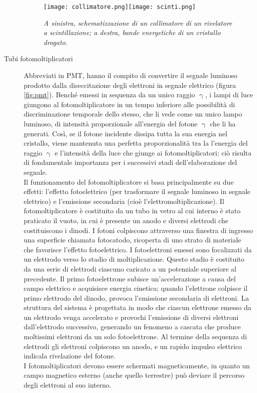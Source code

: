 \documentclass{report}
\newcommand{\figref}[1]{figura \ref{#1}}
\numberwithin{equation}{section}
\numberwithin{figure}{section}
\begin{document}
\begin{description}
\begin{figure}[htp]
    \centering
    \texttt{[image: collimatore.png]}\quad\texttt{[image: scinti.png]}
    \caption{\label{fig:collimatore} \textit{A sinistra, schematizzazione di un collimatore di un rivelatore a scintillazione; a destra, bande energetiche di un cristallo drogato}.}
\end{figure}

\item[Tubi fotomoltiplicatori] Abbreviati in PMT, hanno il compito di convertire il segnale luminoso prodotto dalla diseccitazione degli elettroni in segnale elettrico (\figref{fig:pmt}). Benché emessi in sequenza da un unico raggio $\upgamma$, i lampi di luce giungono al fotomoltiplicatore in un tempo inferiore alle possibilità di discriminazione temporale dello stesso, che li vede come un unico lampo luminoso, di intensità proporzionale all'energia del fotone $\upgamma$ che li ha generati. Così, se il fotone incidente dissipa tutta la sua energia nel cristallo, viene mantenuta una perfetta proporzionalità tra la l'energia del raggio $\upgamma$ e l'intensità della luce che giunge ai fotomoltiplicatori; ciò risulta di fondamentale importanza per i successivi stadi dell'elaborazione del segnale.\\
Il funzionamento del fotomoltiplicatore si basa principalmente su due effetti: l’effetto fotoelettrico (per trasformare il segnale luminoso in segnale elettrico) e l’emissione secondaria (cioè l'elettromoltiplicazione). Il fotomoltiplicatore è costituito da un tubo in vetro al cui interno è stato praticato il vuoto, in cui è presente un anodo e diversi elettrodi che costituiscono i dinodi. I fotoni colpiscono attraverso una finestra di ingresso una superficie chiamata fotocatodo, ricoperta di uno strato di materiale che favorisce l’effetto fotoelettrico. I fotoelettroni emessi sono focalizzati da un elettrodo verso lo stadio di moltiplicazione. Questo stadio è costituito da una serie di elettrodi ciascuno caricato a un potenziale superiore al precedente. Il primo fotoelettrone subisce un'accelerazione a causa del campo elettrico e acquisisce energia cinetica; quando l'elettrone colpisce il primo elettrodo del dinodo, provoca l’emissione secondaria di elettroni. La struttura del sistema è progettata in modo che ciascun elettrone emesso da un elettrodo venga accelerato e provochi l'emissione di diversi elettroni dall'elettrodo successivo, generando un fenomeno a cascata che produce moltissimi elettroni da un solo fotoelettrone. Al termine della sequenza di elettrodi gli elettroni colpiscono un anodo, e un rapido impulso elettrico indicala rivelazione del fotone.\\
I fotomoltiplicatori devono essere schermati magneticamente, in quanto un campo magnetico esterno (anche quello terrestre) può deviare il percorso degli elettroni al suo interno.
\end{description}
\end{document}
